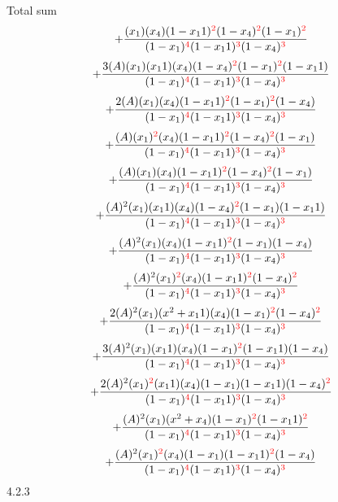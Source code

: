 \documentclass{article}
\begin{document}
Total sum
\[+\frac{(x_1)(x_4)(1-x_11)^{\textcolor{red}{2}}(1-x_4)^{\textcolor{red}{2}}(1-x_1)^{\textcolor{red}{2}}}{(1-x_1)^{\textcolor{red}{4}}(1-x_11)^{\textcolor{red}{3}}(1-x_4)^{\textcolor{red}{3}}}\]\[+\frac{3(A)(x_1)(x_11)(x_4)(1-x_4)^{\textcolor{red}{2}}(1-x_1)^{\textcolor{red}{2}}(1-x_11)}{(1-x_1)^{\textcolor{red}{4}}(1-x_11)^{\textcolor{red}{3}}(1-x_4)^{\textcolor{red}{3}}}\]\[+\frac{2(A)(x_1)(x_4)(1-x_11)^{\textcolor{red}{2}}(1-x_1)^{\textcolor{red}{2}}(1-x_4)}{(1-x_1)^{\textcolor{red}{4}}(1-x_11)^{\textcolor{red}{3}}(1-x_4)^{\textcolor{red}{3}}}\]\[+\frac{(A)(x_1)^{\textcolor{red}{2}}(x_4)(1-x_11)^{\textcolor{red}{2}}(1-x_4)^{\textcolor{red}{2}}(1-x_1)}{(1-x_1)^{\textcolor{red}{4}}(1-x_11)^{\textcolor{red}{3}}(1-x_4)^{\textcolor{red}{3}}}\]\[+\frac{(A)(x_1)(x_4)(1-x_11)^{\textcolor{red}{2}}(1-x_4)^{\textcolor{red}{2}}(1-x_1)}{(1-x_1)^{\textcolor{red}{4}}(1-x_11)^{\textcolor{red}{3}}(1-x_4)^{\textcolor{red}{3}}}\]\[+\frac{(A)^{2}(x_1)(x_11)(x_4)(1-x_4)^{\textcolor{red}{2}}(1-x_1)(1-x_11)}{(1-x_1)^{\textcolor{red}{4}}(1-x_11)^{\textcolor{red}{3}}(1-x_4)^{\textcolor{red}{3}}}\]\[+\frac{(A)^{2}(x_1)(x_4)(1-x_11)^{\textcolor{red}{2}}(1-x_1)(1-x_4)}{(1-x_1)^{\textcolor{red}{4}}(1-x_11)^{\textcolor{red}{3}}(1-x_4)^{\textcolor{red}{3}}}\]\[+\frac{(A)^{2}(x_1)^{\textcolor{red}{2}}(x_4)(1-x_11)^{\textcolor{red}{2}}(1-x_4)^{\textcolor{red}{2}}}{(1-x_1)^{\textcolor{red}{4}}(1-x_11)^{\textcolor{red}{3}}(1-x_4)^{\textcolor{red}{3}}}\]\[+\frac{2(A)^{2}(x_1)(x^{2}+x_11)(x_4)(1-x_1)^{\textcolor{red}{2}}(1-x_4)^{\textcolor{red}{2}}}{(1-x_1)^{\textcolor{red}{4}}(1-x_11)^{\textcolor{red}{3}}(1-x_4)^{\textcolor{red}{3}}}\]\[+\frac{3(A)^{2}(x_1)(x_11)(x_4)(1-x_1)^{\textcolor{red}{2}}(1-x_11)(1-x_4)}{(1-x_1)^{\textcolor{red}{4}}(1-x_11)^{\textcolor{red}{3}}(1-x_4)^{\textcolor{red}{3}}}\]\[+\frac{2(A)^{2}(x_1)^{\textcolor{red}{2}}(x_11)(x_4)(1-x_1)(1-x_11)(1-x_4)^{\textcolor{red}{2}}}{(1-x_1)^{\textcolor{red}{4}}(1-x_11)^{\textcolor{red}{3}}(1-x_4)^{\textcolor{red}{3}}}\]\[+\frac{(A)^{2}(x_1)(x^{2}+x_4)(1-x_1)^{\textcolor{red}{2}}(1-x_11)^{\textcolor{red}{2}}}{(1-x_1)^{\textcolor{red}{4}}(1-x_11)^{\textcolor{red}{3}}(1-x_4)^{\textcolor{red}{3}}}\]\[+\frac{(A)^{2}(x_1)^{\textcolor{red}{2}}(x_4)(1-x_1)(1-x_11)^{\textcolor{red}{2}}(1-x_4)}{(1-x_1)^{\textcolor{red}{4}}(1-x_11)^{\textcolor{red}{3}}(1-x_4)^{\textcolor{red}{3}}}\]
4.2.3
\end{document}
